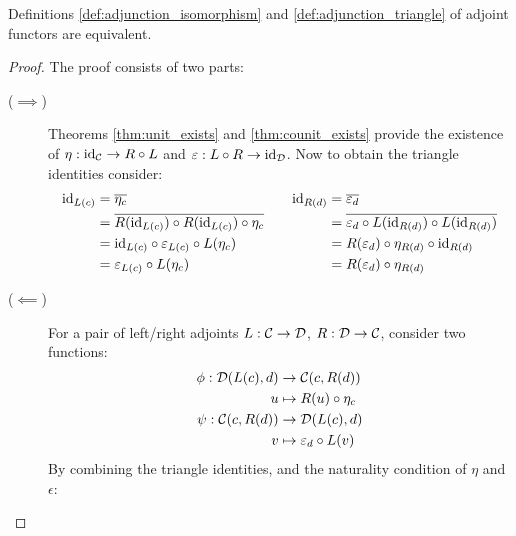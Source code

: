 \begin{theorem}
  Definitions \ref{def:adjunction_isomorphism} and \ref{def:adjunction_triangle}
  of adjoint functors are equivalent.

  \begin{proof}
    The proof consists of two parts:
    \begin{description}
      \item[($\implies$)] Theorems \ref{thm:unit_exists} and
        \ref{thm:counit_exists} provide the existence of $\eta: \mathrm{id}_{\mathcal{C}} \to
        R\circ L$ and $\varepsilon: L\circ R \to \mathrm{id}_{\mathcal{D}}$. Now to obtain the
        triangle identities consider:
        \[
          \begin{aligned}
            \mathrm{id}_{L(c)} &= \overline{\eta_c}\\
              &= \overline{R(\mathrm{id}_{L(c)})\circ R(\mathrm{id}_{L(c)})\circ \eta_c}\\
              &= \mathrm{id}_{L(c)} \circ \varepsilon_{L(c)}\circ L(\eta_c)\\
              &= \varepsilon_{L(c)}\circ L(\eta_c)
          \end{aligned}
          \qquad
          \begin{aligned}
            \mathrm{id}_{R(d)} &= \overline{\varepsilon_d}\\
              &= \overline{\varepsilon_d
                \circ L(\mathrm{id}_{R(d)})\circ L(\mathrm{id}_{R(d)})}\\
              &= R(\varepsilon_d) \circ \eta_{R(d)} \circ \mathrm{id}_{R(d)}\\
              &= R(\varepsilon_d) \circ \eta_{R(d)}
          \end{aligned}
        \]
      \item[($\impliedby$)] For a pair of left/right adjoints $L:\mathcal{C}\to \mathcal{D}$,
        $R:\mathcal{D}\to \mathcal{C}$, consider two functions:
        \[
          \begin{aligned}
            \phi: \mathcal{D}(L(c), d) &\to \mathcal{C}(c, R(d))\\
            u &\mapsto R(u)\circ \eta_c\\
            \psi: \mathcal{C}(c, R(d)) &\to \mathcal{D}(L(c), d)\\
            v &\mapsto \varepsilon_d \circ L(v)
          \end{aligned}
        \]
        By combining the triangle identities, and the naturality condition of $\eta$ and $\epsilon$:


\end{description}
\end{proof}
\end{theorem}
